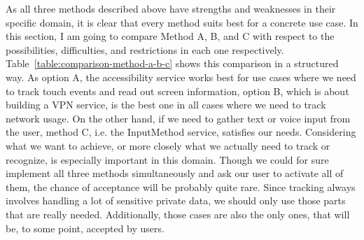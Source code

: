 As all three methods described above have strengths and weaknesses in their specific domain, it is clear that every method suits best for a concrete use case. In this section, I am going to compare Method A, B, and C with respect to the possibilities, difficulties, and restrictions in each one respectively. Table~\ref{table:comparison-method-a-b-c} shows this comparison in a structured way. As option A, the accessibility service works best for use cases where we need to track touch events and read out screen information, option B, which is about building a VPN service, is the best one in all cases where we need to track network usage. On the other hand, if we need to gather text or voice input from the user, method C, i.e. the InputMethod service, satisfies our needs. Considering what we want to achieve, or more closely what we actually need to track or recognize, is especially important in this domain. Though we could for sure implement all three methods simultaneously and ask our user to activate all of them, the chance of acceptance will be probably quite rare. Since tracking always involves handling a lot of sensitive private data, we should only use those parts that are really needed. Additionally, those cases are also the only ones, that will be, to some point, accepted by users.

